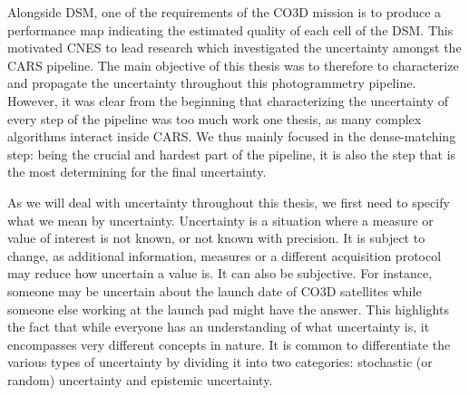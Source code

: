 Alongside DSM, one of the requirements of the CO3D mission is to produce a performance map indicating the estimated quality of each cell of the DSM. This motivated CNES to lead research which investigated the uncertainty amongst the CARS pipeline. The main objective of this thesis was to therefore to characterize and propagate the uncertainty throughout this photogrammetry pipeline. However, it was clear from the beginning that characterizing the uncertainty of every step of the pipeline was too much work one thesis, as many complex algorithms interact inside CARS. We thus mainly focused in the dense-matching step: being the crucial and hardest part of the pipeline, it is also the step that is the most determining for the final uncertainty.

As we will deal with uncertainty throughout this thesis, we first need to specify what we mean by uncertainty. Uncertainty is a situation where a measure or value of interest is not known, or not known with precision. It is subject to change, as additional information, measures or a different acquisition protocol may reduce how uncertain a value is. It can also be subjective. For instance, someone may be uncertain about the launch date of CO3D satellites while someone else working at the launch pad might have the answer. This highlights the fact that while everyone has an understanding of what uncertainty is, it encompasses very different concepts in nature. It is common to differentiate the various types of uncertainty by dividing it into two categories: stochastic (or random) uncertainty and epistemic uncertainty.

